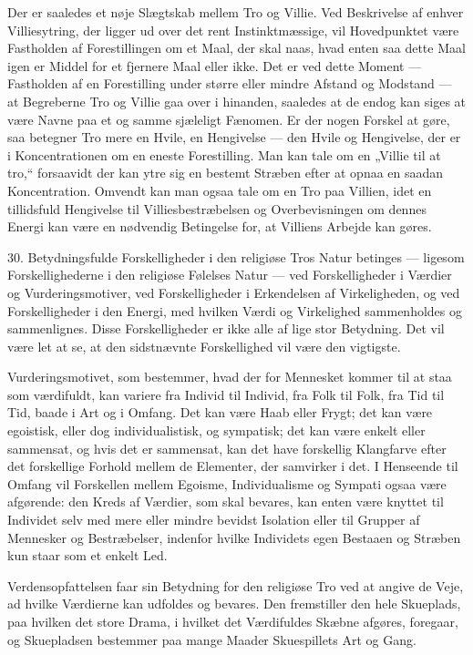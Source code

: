 \documentclass[12pt,a4paper,openany]{book}
\newcommand{\opage}[1]{\marginnote{\footnotesize\textit{[#1]}}}
\begin{document}
Der er saaledes et nøje Slægtskab mellem Tro og Villie. Ved Beskrivelse
af enhver Villiesytring, der ligger ud over det rent Instinktmæssige,
vil Hovedpunktet være Fastholden af Forestillingen om et Maal, der skal
naas, hvad enten saa dette Maal igen er Middel for et fjernere Maal
eller ikke. Det er ved dette Moment --- Fastholden af en Forestilling
under større eller mindre Afstand og Modstand --- at Begreberne Tro og
Villie gaa over i hinanden, saaledes at de endog kan siges at være Navne
paa et og samme sjæleligt Fænomen. Er der nogen Forskel at gøre, saa
betegner Tro mere en Hvile, en Hengivelse --- den Hvile og Hengivelse,
der er i Koncentrationen om en eneste Forestilling. Man kan tale om en
„Villie til at tro,“ forsaavidt der kan ytre sig en bestemt Stræben
efter at opnaa en saadan Koncentration. Omvendt kan man ogsaa tale om en
Tro paa Villien, idet en tillidsfuld Hengivelse til Villiesbestræbelsen
og Overbevisningen om dennes Energi kan være en nødvendig Betingelse
for, at Villiens Arbejde kan gøres.

30. Betydningsfulde Forskelligheder i den religiøse Tros Natur betinges
--- ligesom Forskellighederne i den religiøse Følelses Natur --- ved
Forskelligheder i Værdier og Vurderingsmotiver,
\opage{72}ved Forskelligheder i Erkendelsen af Virkeligheden, og ved
Forskelligheder i den Energi, med hvilken Værdi og Virkelighed
sammenholdes og sammenlignes. Disse Forskelligheder er ikke alle af lige
stor Betydning. Det vil være let at se, at den sidstnævnte Forskellighed
vil være den vigtigste.

Vurderingsmotivet, som bestemmer, hvad der for Mennesket kommer til at
staa som værdifuldt, kan variere fra Individ til Individ, fra Folk til
Folk, fra Tid til Tid, baade i Art og i Omfang. Det kan være Haab eller
Frygt; det kan være egoistisk, eller dog individualistisk, og sympatisk;
det kan være enkelt eller sammensat, og hvis det er sammensat, kan det
have forskellig Klangfarve efter det forskellige Forhold mellem de
Elementer, der samvirker i det. I Henseende til Omfang vil Forskellen
mellem Egoisme, Individualisme og Sympati ogsaa være afgørende: den
Kreds af Værdier, som skal bevares, kan enten være knyttet til Individet
selv med mere eller mindre bevidst Isolation eller til Grupper af
Mennesker og Bestræbelser, indenfor hvilke Individets egen Bestaaen og
Stræben kun staar som et enkelt Led.

Verdensopfattelsen faar sin Betydning for den religiøse Tro ved at
angive de Veje, ad hvilke Værdierne kan udfoldes og bevares. Den
fremstiller den hele Skueplads, paa hvilken det store Drama, i hvilket
det Værdifuldes Skæbne afgøres, foregaar, og Skuepladsen bestemmer paa
mange Maader Skuespillets Art og Gang.
\end{document}

